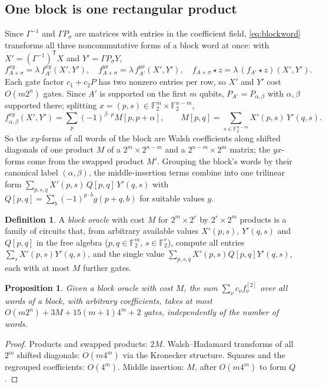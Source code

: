 \documentclass[11pt]{article}
\newtheorem{proposition}[theorem]{Proposition}
\theoremstyle{definition}
\newtheorem{definition}[theorem]{Definition}
\theoremstyle{remark}
\newcommand{\F}{\mathbb{F}}
\begin{document}
\subsection{One block is one rectangular product}
Since $\Gamma^{-1}$ and $\Gamma P_\sigma$ are matrices with entries in the coefficient field,
\eqref{eq:blockword} transforms all three
noncommutative forms of a block word at once: with $X'=(\Gamma^{-1})^{\mathsf T}X$ and $Y'=\Gamma P_\sigma Y$,
\[
f^{xy}_{A+\sigma}=\lambda\,f^{xy}_{A'}(X',Y'),\quad f^{yx}_{A+\sigma}=\lambda\,f^{yx}_{A'}(X',Y'),\quad
f_{A+\sigma}\star z=\lambda\,(f_{A'}\star z)(X',Y').
\]
Each gate factor $c_1+c_2P$ has two nonzero entries per row, so $X'$ and $Y'$ cost $O(m2^n)$ gates. Since $A'$ is
supported on the first $m$ qubits, $P_{A'}=P_{\alpha,\beta}$ with $\alpha,\beta$ supported there; splitting
$x=(p,s)\in\F_2^m\times\F_2^{n-m}$,
\[
f^{xy}_{\alpha,\beta}(X',Y')=\sum_{p}(-1)^{\beta\cdot p}M[p,p+\alpha],\qquad
M[p,q]=\sum_{s\in\F_2^{n-m}}X'(p,s)\,Y'(q,s).
\]
So the $xy$-forms of all words of the block are Walsh coefficients along shifted diagonals of one product $M$ of a
$2^m\times2^{n-m}$ and a $2^{n-m}\times2^m$ matrix; the $yx$-forms come from the swapped product $M'$. Grouping the
block's words by their canonical label $(\alpha,\beta)$, the middle-insertion terms combine into one trilinear
form $\sum_{p,s,q}X'(p,s)\,Q[p,q]\,Y'(q,s)$ with $Q[p,q]=\sum_b(-1)^{p\cdot b}g(p+q,b)$ for suitable values $g$.

\begin{definition}\label{def:oracle}
A \emph{block oracle} with cost $M$ for $2^m\times2^r$ by $2^r\times2^m$ products is a family of circuits that, from
arbitrary available values $X'(p,s)$, $Y'(q,s)$ and $Q[p,q]$ in the free algebra ($p,q\in\F_2^m$, $s\in\F_2^r$),
compute all entries $\sum_sX'(p,s)Y'(q,s)$, and the single value $\sum_{p,s,q}X'(p,s)Q[p,q]Y'(q,s)$, each with at
most $M$ further gates.
\end{definition}

\begin{proposition}\label{prop:block}
Given a block oracle with cost $M$, the sum $\sum_\nu c_\nu f_\nu^{[2]}$ over all words of a block, with arbitrary
coefficients, takes at most $O(m2^n)+3M+15(m+1)4^m+2$ gates, independently of the number of words.
\end{proposition}
\begin{proof}
Products and swapped products: $2M$. Walsh--Hadamard transforms of all $2^m$ shifted diagonals: $O(m4^m)$ via the
Kronecker structure. Squares and the regrouped coefficients: $O(4^m)$. Middle insertion: $M$, after $O(m4^m)$ to
form $Q$.
\end{proof}
\end{document}
